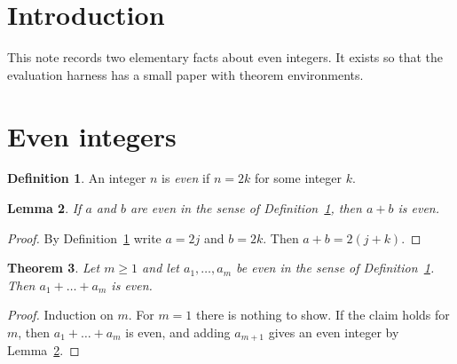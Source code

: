 \documentclass{article}
\newtheorem{theorem}{Theorem}
\newtheorem{lemma}[theorem]{Lemma}
\theoremstyle{definition}
\newtheorem{definition}[theorem]{Definition}
\begin{document}
\section{Introduction}
\label{sec:intro}
This note records two elementary facts about even integers. It exists so
that the evaluation harness has a small paper with theorem environments.

\section{Even integers}
\label{sec:even}

\begin{definition}
\label{def:even}
An integer $n$ is \emph{even} if $n = 2k$ for some integer $k$.
\end{definition}

\begin{lemma}
\label{lem:sum}
If $a$ and $b$ are even in the sense of Definition~\ref{def:even}, then
$a + b$ is even.
\end{lemma}
\begin{proof}
By Definition~\ref{def:even} write $a = 2j$ and $b = 2k$. Then
$a + b = 2(j + k)$.
\end{proof}

\begin{theorem}
\label{thm:finite-sum}
Let $m \geq 1$ and let $a_1, \dots, a_m$ be even in the sense of
Definition~\ref{def:even}. Then $a_1 + \dots + a_m$ is even.
\end{theorem}
\begin{proof}
Induction on $m$. For $m = 1$ there is nothing to show. If the claim holds
for $m$, then $a_1 + \dots + a_m$ is even, and adding $a_{m+1}$ gives an
even integer by Lemma~\ref{lem:sum}.
\end{proof}
\end{document}
